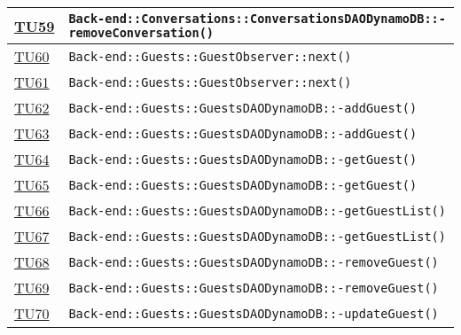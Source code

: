 \begin{longtable}{|>{\centering}m{1cm}|m{12cm}<{\centering}|}
\hyperlink{TU59}{TU59} & \texttt{Back-end::Conversations::ConversationsDAODynamoDB::-\linebreak removeConversation()}\\ \hline

\hyperlink{TU60}{TU60} & \texttt{Back-end::Guests::GuestObserver::next()}\\ \hline

\hyperlink{TU61}{TU61} & \texttt{Back-end::Guests::GuestObserver::next()}\\ \hline

\hyperlink{TU62}{TU62} & \texttt{Back-end::Guests::GuestsDAODynamoDB::-\linebreak addGuest()}\\ \hline

\hyperlink{TU63}{TU63} & \texttt{Back-end::Guests::GuestsDAODynamoDB::-\linebreak addGuest()}\\ \hline

\hyperlink{TU64}{TU64} & \texttt{Back-end::Guests::GuestsDAODynamoDB::-\linebreak getGuest()}\\ \hline

\hyperlink{TU65}{TU65} & \texttt{Back-end::Guests::GuestsDAODynamoDB::-\linebreak getGuest()}\\ \hline

\hyperlink{TU66}{TU66} & \texttt{Back-end::Guests::GuestsDAODynamoDB::-\linebreak getGuestList()}\\ \hline

\hyperlink{TU67}{TU67} & \texttt{Back-end::Guests::GuestsDAODynamoDB::-\linebreak getGuestList()}\\ \hline

\hyperlink{TU68}{TU68} & \texttt{Back-end::Guests::GuestsDAODynamoDB::-\linebreak removeGuest()}\\ \hline

\hyperlink{TU69}{TU69} & \texttt{Back-end::Guests::GuestsDAODynamoDB::-\linebreak removeGuest()}\\ \hline

\hyperlink{TU70}{TU70} & \texttt{Back-end::Guests::GuestsDAODynamoDB::-\linebreak updateGuest()}\\ \hline


\end{longtable}
